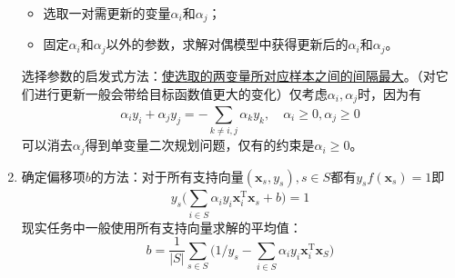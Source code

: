 \documentclass{ctexart}
\begin{document}
\begin{enumerate}[1.]
\begin{itemize}
							\item 选取一对需更新的变量$\alpha_i$和$\alpha_j$；
							\item 固定$\alpha_i$和$\alpha_j$以外的参数，求解对偶模型中获得更新后的$\alpha_i$和$\alpha_j$。
						\end{itemize}
						选择参数的启发式方法：\underline{使选取的两变量所对应样本之间的间隔最大}。（对它们进行更新一般会带给目标函数值更大的变化）仅考虑$\alpha_i,\alpha_j$时，因为有\[\alpha_iy_i+\alpha_jy_j=-\sum_{k\neq i,j}^{}\alpha_ky_k,\quad \alpha_i\ge0,\alpha_j\ge0\]可以消去$\alpha_j$得到单变量二次规划问题，仅有的约束是$\alpha_i\ge0$。
						\item 确定偏移项$b$的方法：对于所有支持向量$(\bm{x}_s,y_s),s\in S$都有$y_sf(\bm{x}_s)=1$即\[y_s\bigg(\sum_{i\in S}^{}\alpha_iy_i\bm{x}_i^{\mathrm{T}}\bm{x}_s+b\bigg)=1\]现实任务中一般使用所有支持向量求解的平均值：\[b=\frac{1}{|S|}\sum_{s\in S}^{}\bigg(1/y_s-\sum_{i\in S}^{}\alpha_iy_i\bm{x}_i^{\mathrm{T}}\bm{x}_S\bigg)\]
					\end{enumerate}
\end{document}

